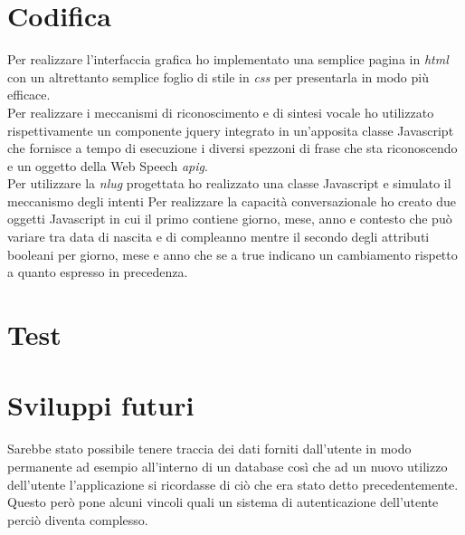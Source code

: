 \section{Codifica}
Per realizzare l'interfaccia grafica ho implementato una semplice pagina in \emph{\gls{html}} con un altrettanto semplice foglio di stile in \emph{\gls{css}} per presentarla in modo più efficace. \\
Per realizzare i meccanismi di riconoscimento e di sintesi vocale ho utilizzato rispettivamente un componente jquery integrato in un'apposita classe Javascript che fornisce a tempo di esecuzione i diversi spezzoni di frase che sta riconoscendo e un oggetto della Web Speech \emph{\gls{apig}}. \\
Per utilizzare la \emph{\gls{nlug}} progettata ho realizzato una classe Javascript e simulato il meccanismo degli intenti %
Per realizzare la capacità conversazionale ho creato due oggetti Javascript in cui il primo contiene giorno, mese, anno e contesto che può variare tra data di nascita e di compleanno mentre il secondo degli attributi booleani per giorno, mese e anno che se a true indicano un cambiamento rispetto a quanto espresso in precedenza. %

\section{Test}

\section{Sviluppi futuri}
Sarebbe stato possibile tenere traccia dei dati forniti dall'utente in modo permanente ad esempio all'interno di un database così che ad un nuovo utilizzo dell'utente l'applicazione si ricordasse di ciò che era stato detto precedentemente. Questo però pone alcuni vincoli quali un sistema di autenticazione dell'utente perciò diventa complesso.